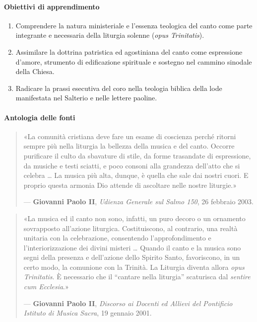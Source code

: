 \documentclass[12pt,a4paper]{article}
\begin{document}
	\paragraph{Obiettivi di apprendimento}\label{obiettivi-di-apprendimento}
	
	\begin{enumerate}[label=\arabic*.,leftmargin=*]
		\item Comprendere la natura ministeriale e l'essenza teologica del canto come parte integrante e necessaria della liturgia solenne (\emph{opus Trinitatis}).
		\item Assimilare la dottrina patristica ed agostiniana del canto come espressione d'amore, strumento di edificazione spirituale e sostegno nel cammino sinodale della Chiesa.
		\item Radicare la prassi esecutiva del coro nella teologia biblica della lode manifestata nel Salterio e nelle lettere paoline.
	\end{enumerate}
	
	\paragraph{Antologia delle fonti}\label{antologia-delle-fonti}
	
	\begin{quote}
		«La comunità cristiana deve fare un esame di coscienza perché ritorni sempre più nella liturgia la bellezza della musica e del canto. Occorre purificare il culto da sbavature di stile, da forme trasandate di espressione, da musiche e testi sciatti, e poco consoni alla grandezza dell'atto che si celebra \ldots{} La musica più alta, dunque, è quella che sale dai nostri cuori. E proprio questa armonia Dio attende di ascoltare nelle nostre liturgie.»
		
		--- \textbf{Giovanni Paolo II}, \emph{Udienza Generale sul Salmo 150}, 26 febbraio 2003.
	\end{quote}
	
	\begin{quote}
		«La musica ed il canto non sono, infatti, un puro decoro o un ornamento sovrapposto all'azione liturgica. Costituiscono, al contrario, una realtà unitaria con la celebrazione, consentendo l'approfondimento e l'interiorizzazione dei divini misteri \ldots{} Quando il canto e la musica sono segni della presenza e dell'azione dello Spirito Santo, favoriscono, in un certo modo, la comunione con la Trinità. La Liturgia diventa allora \emph{opus Trinitatis}. È necessario che il ``cantare nella liturgia'' scaturisca dal \emph{sentire cum Ecclesia}.»
		
		--- \textbf{Giovanni Paolo II}, \emph{Discorso ai Docenti ed Allievi del Pontificio Istituto di Musica Sacra}, 19 gennaio 2001.
	\end{quote}
	
\end{document}
